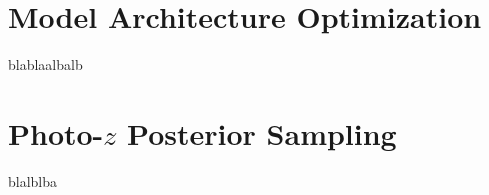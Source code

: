 \appendix
\section{Model Architecture Optimization}
\label{app:architecture}

blablaalbalb

\section{Photo-$z$ Posterior Sampling}
\label{app:posterior}

blalblba